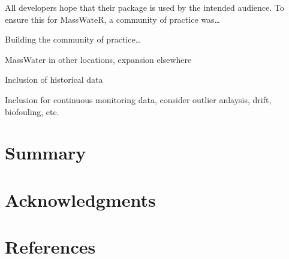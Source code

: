 All developers hope that their package is used by the intended audience. To ensure this for MassWateR, a community of practice was\ldots{}

Building the community of practice\ldots{}

MassWater in other locations, expansion elsewhere

Inclusion of historical data

Inclusion for continuous monitoring data, consider outlier anlaysis, drift, biofouling, etc.

\hypertarget{summary}{%
\section{Summary}\label{summary}}

\hypertarget{acknowledgments}{%
\section{Acknowledgments}\label{acknowledgments}}

\hypertarget{references}{%
\section*{References}\label{references}}

